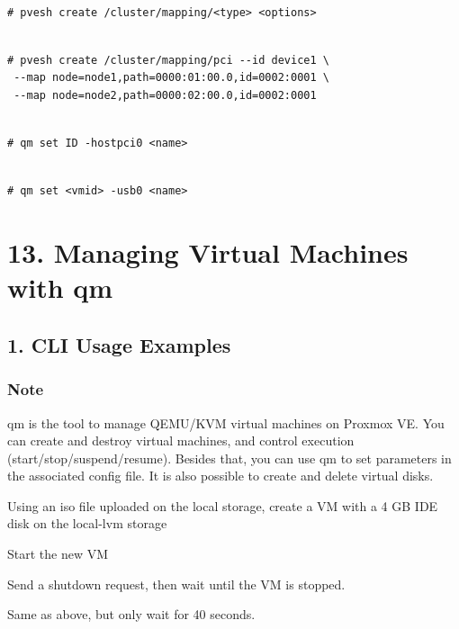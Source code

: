 \begin{lstlisting}

# pvesh create /cluster/mapping/<type> <options>

\end{lstlisting}

\begin{lstlisting}

# pvesh create /cluster/mapping/pci --id device1 \
 --map node=node1,path=0000:01:00.0,id=0002:0001 \
 --map node=node2,path=0000:02:00.0,id=0002:0001

\end{lstlisting}

\begin{lstlisting}

# qm set ID -hostpci0 <name>

\end{lstlisting}

\begin{lstlisting}

# qm set <vmid> -usb0 <name>

\end{lstlisting}


\section{13. Managing Virtual Machines with qm}

\subsection{1. CLI Usage Examples}

\subsubsection{Note}

qm is the tool to manage QEMU/KVM virtual machines on Proxmox VE. You can create and destroy virtual machines, and control execution (start/stop/suspend/resume). Besides that, you can use qm to set parameters in the associated config file. It is also possible to create and delete virtual disks.

Using an iso file uploaded on the local storage, create a VM with a 4 GB IDE disk on the local-lvm storage

Start the new VM

Send a shutdown request, then wait until the VM is stopped.

Same as above, but only wait for 40 seconds.

